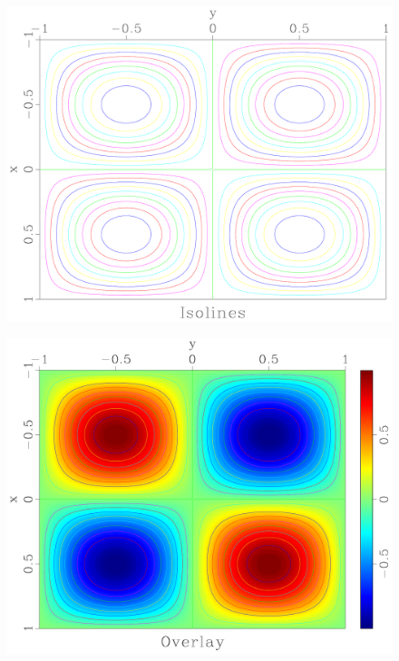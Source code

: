 \begin{frame}
  \begin{figure}
  \includegraphics[scale=0.25]{plot/Fig/csqsurf.pdf}
  \end{figure}
\end{frame}

\begin{frame}
  \begin{figure}
  \includegraphics[scale=0.25]{plot/Fig/csurf.pdf}
  \end{figure}
\end{frame}

